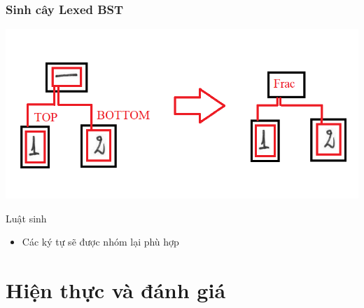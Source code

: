 \documentclass{beamer}
\begin{document}
\begin{frame}
	\frametitle{Sinh cây Lexed BST}
	\begin{center}
		\centering
		\includegraphics[width=0.6\linewidth]{lex1.png}
	\end{center}
	
	\begin{block}{Luật sinh}
		\begin{itemize}
			\item Các ký tự sẽ được nhóm lại phù hợp
		\end{itemize}
	\end{block}
	
\end{frame}

	
	
	
	
	
	
	
	\section{Hiện thực và đánh giá}
\end{document}
